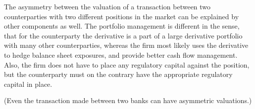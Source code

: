 \documentclass[10pt,a4paper]{article}
\begin{document}
        The asymmetry between the valuation of a transaction between two counterparties with two different positions in the market can be explained by other components as well.
        The portfolio management is different in the sense,
        that for the counterparty the derivative is a part of a large derivative portfolio with many other counterparties,
        whereas the firm most likely uses the derivative to hedge balance sheet exposures,
        and provide better cash flow management.
        Also, the firm does not have to place any regulatory capital against the position,
        but the counterparty must on the contrary have the appropriate regulatory capital in place.

        (Even the transaction made between two banks can have asymmetric valuations.)
\end{document}
